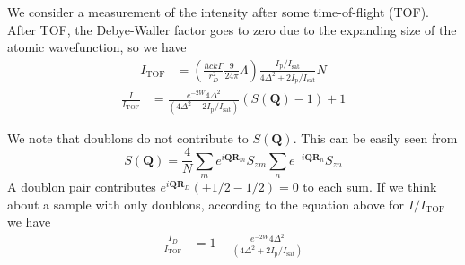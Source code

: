 \documentclass[11pt,letter]{article}
\newcommand{\bv}[1]{\ensuremath{\bm{#1}}}
\newcommand{\iisat}{\ensuremath{I_{\mathrm{p}}/I_{\mathrm{sat}}}}
\begin{document}
We consider a measurement of the intensity after some
time-of-flight (TOF).  After TOF, the Debye-Waller factor goes to zero due to
the expanding size of the atomic wavefunction, so we have 
\begin{equation}
\begin{split} 
 I_{\text{TOF}}  
&  =
  \left( 
 \frac{\hbar c k \Gamma}{r_{D}^{2}}  
     \frac{9}{24\pi} \Lambda 
  \right) 
  \frac{ \iisat }{ 4 \Delta^{2} + 2 \iisat } N 
\end{split}
\end{equation}
\begin{equation}
\begin{split} 
 \frac{I}{I_{\text{TOF}} } 
&  =
      \frac{ e^{-2W}4 \Delta^{2}  } 
           {(4 \Delta^{2} + 2 \iisat) } 
   \left( S(\bv{Q})
     - 1 \right)
  + 1 
\end{split}
\end{equation}

We note that doublons do not contribute to $S(\bv{Q})$.  This can be easily
seen from 
\begin{equation}
   S(\bv{Q}) =  
      \frac{4}{N}
      \sum_{m} e^{ i \bv{Q} \bv{R}_{m}  }  S_{zm}
      \sum_{n} e^{ -i \bv{Q} \bv{R}_{n}  }  S_{zn}
\end{equation}
A doublon pair contributes $ e^{i\bv{Q}\bv{R}_{D} } ( +1/2 - 1/2 ) = 0 $ to
each sum.  If we think about a sample with only doublons, according to the
equation above for $I/I_{\text{TOF}}$ we have   
\begin{equation}
\begin{split} 
 \frac{I_{D}}{I_{\text{TOF}} } 
&  = 1- 
      \frac{ e^{-2W}4 \Delta^{2}  } 
           {(4 \Delta^{2} + 2 \iisat) } 
\end{split}
\end{equation}
\end{document}

